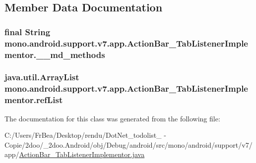 \subsection{Member Data Documentation}
\hypertarget{classmono_1_1android_1_1support_1_1v7_1_1app_1_1_action_bar___tab_listener_implementor_627fdd5a34632303bbbcda69734cdae1}{
\subsubsection[{\_\-\_\-md\_\-methods}]{\setlength{\rightskip}{0pt plus 5cm}final String {\bf mono.android.support.v7.app.ActionBar\_\-TabListenerImplementor.\_\-\_\-md\_\-methods}}}
\label{classmono_1_1android_1_1support_1_1v7_1_1app_1_1_action_bar___tab_listener_implementor_627fdd5a34632303bbbcda69734cdae1}


\hypertarget{classmono_1_1android_1_1support_1_1v7_1_1app_1_1_action_bar___tab_listener_implementor_99a1ad9e192d74080ecd063f146f6c20}{
\subsubsection[{refList}]{\setlength{\rightskip}{0pt plus 5cm}java.util.ArrayList {\bf mono.android.support.v7.app.ActionBar\_\-TabListenerImplementor.refList}}}
\label{classmono_1_1android_1_1support_1_1v7_1_1app_1_1_action_bar___tab_listener_implementor_99a1ad9e192d74080ecd063f146f6c20}




The documentation for this class was generated from the following file:\begin{CompactItemize}
\item 
C:/Users/FrBea/Desktop/rendu/DotNet\_\-todolist\_ - Copie/2doo/\_\-2doo.Android/obj/Debug/android/src/mono/android/support/v7/app/\hyperlink{_action_bar___tab_listener_implementor_8java}{ActionBar\_\-TabListenerImplementor.java}\end{CompactItemize}
